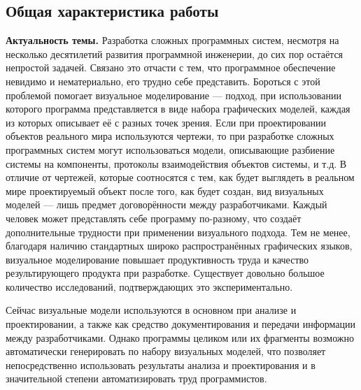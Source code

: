 \subsection*{\Large Общая характеристика работы}
\fontsize{14pt}{15pt}\selectfont
\textbf{Актуальность темы.}
Разработка сложных программных систем, несмотря на несколько десятилетий 
развития программной инженерии, до сих пор остаётся непростой задачей. 
Связано это отчасти с тем, что программное обеспечение невидимо и нематериально, 
его трудно себе представить. Бороться с этой проблемой помогает визуальное 
моделирование --- подход, при использовании которого программа представляется в 
виде набора графических моделей, каждая из которых описывает её с разных точек 
зрения. Если при проектировании объектов реального мира используются чертежи, то при 
разработке сложных программных систем могут использоваться модели, описывающие разбиение системы на компоненты, 
протоколы взаимодействия объектов системы, и т.д. В отличие от чертежей, которые 
соотносятся с тем, как будет выглядеть в реальном мире проектируемый объект 
после того, как будет создан, вид визуальных моделей --- лишь предмет 
договорённости между разработчиками. Каждый человек может представлять себе 
программу по-разному, что создаёт дополнительные трудности при применении 
визуального подхода. Тем не менее, благодаря наличию стандартных широко 
распространённых графических языков, визуальное моделирование повышает 
продуктивность труда и качество результирующего продукта при разработке. 
Существует довольно большое количество исследований, подтверждающих это экспериментально.

Сейчас визуальные модели используются в основном при анализе и проектировании, 
а также как средство документирования и передачи информации между 
разработчиками. Однако программы целиком или их фрагменты возможно 
автоматически генерировать по набору визуальных моделей, что позволяет 
непосредственно использовать результаты анализа и проектирования и в 
значительной степени автоматизировать труд программистов. 

